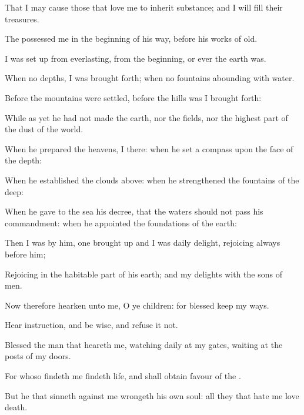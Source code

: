 {That I may cause those that
love me to
inherit
substance; and I will
fill their
treasures.


\par }{\PP {}The
{}
possessed me in the
beginning of his
way,
before his
works of old.

I was set
up from
everlasting, from the
beginning, or
ever the
earth was.

When
{} no
depths, I was brought
forth; when
{} no
fountains
abounding with
water.

Before the
mountains were
settled,
before the
hills was I brought
forth:

While as yet he had not
made the
earth, nor the
fields, nor the highest
part of the
dust of the
world.

When he
prepared the
heavens, I
{} there: when he
set a
compass upon the
face of the
depth:

When he
established the
clouds
above: when he
strengthened the
fountains of the
deep:

When he
gave to the
sea his
decree, that the
waters should not
pass his
commandment: when he
appointed the
foundations of the
earth:

Then I was by
him,
{} one brought
up
{} and I was
daily
{}
delight,
rejoicing
always
before him;

Rejoicing in the habitable
part of his
earth; and my
delights
{} with the
sons of
men.


\par }{\PP {}Now therefore
hearken unto me, O ye
children: for
blessed
{}
keep my
ways.

Hear
instruction, and be
wise, and
refuse it not.

Blessed
{} the
man that
heareth me,
watching
daily at my
gates,
waiting at the
posts of my
doors.

For whoso
findeth me
findeth
life, and shall
obtain
favour of the
{}.

But he that
sinneth against me
wrongeth his own
soul: all they that
hate me
love
death.




}
